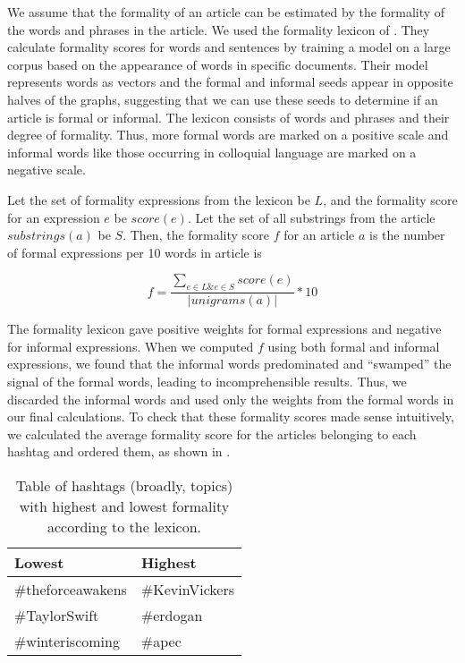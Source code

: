 We assume that the formality of an article can be estimated by the formality of the words and phrases in the article. We used the formality lexicon of \cite{brooke2013multi}. They calculate formality scores for words and sentences by training a model on a large corpus based on the appearance of words in specific documents. Their model represents words as vectors and the formal and informal seeds appear in opposite halves of the graphs, suggesting that we can use these seeds to determine if an article is formal or informal. The lexicon consists of words and phrases and their degree of formality. Thus, more formal words are marked on a positive scale and informal words like those occurring in colloquial language are marked on a negative scale. 

Let the set of formality expressions from the lexicon be $L$, and the formality score for an expression $e$ be $\textit{score}(e)$. Let the set of all substrings from the article $\textit{substrings}(a)$ be $S$. Then, the formality score $f$ for an article $a$ is the number of formal expressions per 10 words in article is   

\begin{equation}
f = \frac{\sum\limits_{e \in L \& e \in S} \textit{score}(e)}{| \textit{unigrams}(a) |} * 10
\end{equation}

The formality lexicon gave positive weights for formal expressions and negative for informal expressions. When we computed $f$ using both formal and informal expressions, we found that the informal words predominated and ``swamped'' the signal of the formal words, leading to incomprehensible results. Thus, we discarded the informal words and used only the weights from the formal words in our final calculations. To check that these formality scores made sense intuitively, we calculated the average formality score for the articles belonging to each hashtag and ordered them, as shown in .

\begin{table}[!htbp]
\centering
\begin{tabular}{|l|l|}
\hline
Lowest  & Highest  \\ \hline
\#theforceawakens       & \#KevinVickers           \\
\#TaylorSwift           & \#erdogan                \\
\#winteriscoming        & \#apec                  \\ \hline
\end{tabular}
\caption[Order of formality ranking in hashtags]{Table of hashtags (broadly, topics) with highest and lowest formality according to the lexicon.}
\label{tab:formal}
\end{table}


